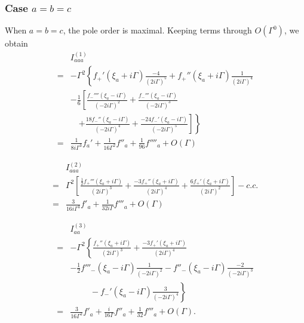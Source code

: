 \documentclass[twocolumn,superscriptaddress]{revtex4-1}
\begin{document}
\subsubsection{Case $a=b=c$}
When $a=b=c$, the pole order is maximal.
Keeping terms through $O(\Gamma^0)$, we obtain
\begin{align}
&I_{aaa}^{(1)}\nonumber \\
=&-\Gamma^2 \left\{
  f_+'(\xi_a+i\Gamma)\frac{-4}{(2i\Gamma)^5}+f_+''(\xi_a+i\Gamma)\frac{1}{(2i\Gamma)^4}\right. \nonumber \\
  &-\frac{1}{6}\left[
    \frac{f_-''''(\xi_a-i\Gamma)}{(-2i\Gamma)^2}+\frac{f_-'''(\xi_a-i\Gamma)}{(-2i\Gamma)^3}\right. \nonumber \\
  &\quad  \left. \left.  +\frac{18f_-''(\xi_a-i\Gamma)}{(-2i\Gamma)^4}+\frac{-24f_-'(\xi_a-i\Gamma)}{(-2i\Gamma)^5}
  \right]
\right\}\nonumber \\
=&\frac{1}{8i\Gamma^3}f_a' +\frac{1}{16\Gamma^2}f''_a+\frac{1}{96}f''''_a+O(\Gamma)
\end{align}

\begin{align}
&I_{aaa}^{(2)}\nonumber \\
=&\Gamma^2\left[
  \frac{\frac{1}{2}f_+'''(\xi_a+i\Gamma)}{(2i\Gamma)^3}+\frac{-3f_+''(\xi_a+i\Gamma)}{(2i\Gamma)^4}+\frac{6f_+'(\xi_a+i\Gamma)}{(2i\Gamma)^2}
\right]-c.c. \nonumber \\
=&\frac{3}{16i\Gamma^3}f'_a+\frac{1}{32i\Gamma}f'''_a+O(\Gamma)
\end{align}

\begin{align}
  &I_{aa}^{(3)}\nonumber \\
=&-\Gamma^2\left\{\frac{f_+''(\xi_a+i\Gamma)}{(2i\Gamma)^3}+\frac{-3f_+'(\xi_a+i\Gamma)}{(2i\Gamma)^4}\right.\nonumber \\
& -\frac{1}{2}f'''_-(\xi_a-i\Gamma)\frac{1}{(-2i\Gamma)^2}-f''_-(\xi_a-i\Gamma)\frac{-2}{(-2i\Gamma)^3}\nonumber \\
&\left.\hspace{1cm}-f_-'(\xi_a-i\Gamma)\frac{3}{(-2i\Gamma)^4}\right\} \nonumber \\
=&\frac{3}{16\Gamma^2}f'_a+\frac{i}{16\Gamma}f''_a+\frac{1}{32}f'''_a+O(\Gamma).
\end{align}
\end{document}
